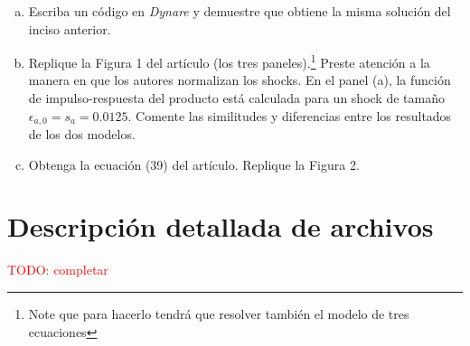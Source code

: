 \documentclass[10pt,a4paper]{article}
\begin{document}
\begin{mdframed}
\begin{enumerate}[(a)]
		\item Escriba un código en \emph{Dynare} y demuestre que obtiene la misma solución del inciso anterior.
		\item Replique la Figura 1 del artículo (los tres paneles).\footnote{Note que para hacerlo tendrá que resolver también el modelo de tres ecuaciones}
		      Preste atención a la manera en que los autores normalizan los shocks. En el panel (a), la función de impulso-respuesta del producto está calculada para un shock de tamaño $\epsilon_{a, 0}=s_{a}=0.0125$. Comente las similitudes y diferencias entre los resultados de los dos modelos.
		\item Obtenga la ecuación (39) del artículo. Replique la Figura 2.
	\end{enumerate}
\end{mdframed}



% 
% 
% 
% 



\appendix
\section{Descripción detallada de archivos}
\label{sec:appendix}
\textcolor{red}{TODO: completar}

\printbibliography
\end{document}
